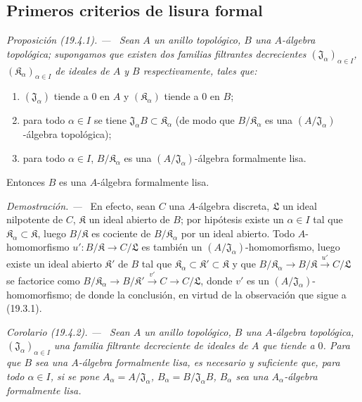 \documentclass[10pt,oneside]{book}
\makeatletter
\newcommand{\setmanualcurrentlabel}[1]{\def\@currentlabel{#1}}
\newenvironment{proposition}[1][]{%
  \setmanualcurrentlabel{#1}\par\medskip\noindent\itshape Proposición (#1). ---\ }{\par}
\newenvironment{corollary}[1][]{%
  \setmanualcurrentlabel{#1}\par\medskip\noindent\itshape Corolario (#1). ---\ }{\par}
\newenvironment{proof}{%
  \par\medskip\noindent\textit{Demostración. ---\ }}{\par}
\makeatother
\begin{document}
\subsection{Primeros criterios de lisura formal}
\label{subsection:0.19.4-es}

\begin{proposition}[19.4.1]
\label{0.19.4.1-es}
Sean $A$ un anillo topológico, $B$ una $A$-álgebra topológica; supongamos
que existen dos familias filtrantes decrecientes
$(\mathfrak J_\alpha)_{\alpha\in I}$,
$(\mathfrak K_\alpha)_{\alpha\in I}$ de ideales de $A$ y $B$
respectivamente, tales que:
\begin{enumerate}
  \item[$1^\circ$] $(\mathfrak J_\alpha)$ tiende a $0$ en $A$ y
  $(\mathfrak K_\alpha)$ tiende a $0$ en $B$;
  \item[$2^\circ$] para todo $\alpha\in I$ se tiene
  $\mathfrak J_\alpha B\subset\mathfrak K_\alpha$ (de modo que
  $B/\mathfrak K_\alpha$ es una
  $(A/\mathfrak J_\alpha)$-álgebra topológica);
  \item[$3^\circ$] para todo $\alpha\in I$,
  $B/\mathfrak K_\alpha$ es una
  $(A/\mathfrak J_\alpha)$-álgebra formalmente lisa.
\end{enumerate}
Entonces $B$ es una $A$-álgebra formalmente lisa.
\end{proposition}

\begin{proof}
En efecto, sean $C$ una $A$-álgebra discreta, $\mathfrak L$ un ideal
nilpotente de $C$, $\mathfrak K$ un ideal abierto de $B$; por hipótesis existe
un $\alpha\in I$ tal que
$\mathfrak K_\alpha\subset\mathfrak K$, luego $B/\mathfrak K$ es
cociente de $B/\mathfrak K_\alpha$ por un ideal abierto. Todo
$A$-homomorfismo $u':B/\mathfrak K\to C/\mathfrak L$ es también un
$(A/\mathfrak J_\alpha)$-homomorfismo, luego existe un ideal abierto
$\mathfrak K'$ de $B$ tal que
$\mathfrak K_\alpha\subset\mathfrak K'\subset\mathfrak K$ y que
$B/\mathfrak K_\alpha\to B/\mathfrak K\xrightarrow{u'}C/\mathfrak L$
se factorice como
$B/\mathfrak K_\alpha\to B/\mathfrak K'\xrightarrow{v'}C\to C/\mathfrak L$,
donde $v'$ es un
$(A/\mathfrak J_\alpha)$-homomorfismo; de donde la conclusión, en virtud de
la observación que sigue a (19.3.1).
\end{proof}

\begin{corollary}[19.4.2]
\label{0.19.4.2-es}
Sean $A$ un anillo topológico, $B$ una $A$-álgebra topológica,
$(\mathfrak J_\alpha)_{\alpha\in I}$ una familia filtrante decreciente
de ideales de $A$ que tiende a $0$. Para que $B$ sea una $A$-álgebra
formalmente lisa, es necesario y suficiente que, para todo $\alpha\in I$, si
se pone $A_\alpha=A/\mathfrak J_\alpha$,
$B_\alpha=B/\mathfrak J_\alpha B$, $B_\alpha$ sea una
$A_\alpha$-álgebra formalmente lisa.
\end{corollary}
\end{document}
